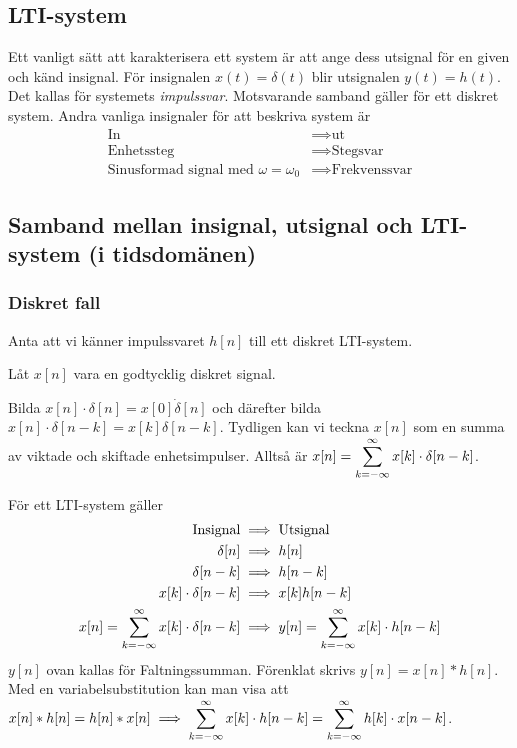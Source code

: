 \documentclass[a4paper]{article}
\begin{document}
\providecommand\fname{}
\renewcommand\fname{19-09-06}

\subsection{LTI-system}
Ett vanligt sätt att karakterisera ett system är att ange dess utsignal
för en given och känd insignal. För insignalen \(
    x(t) = \delta(t)
\) blir utsignalen \(
    y(t) = h(t)
\). Det kallas för systemets \emph{impulssvar}. Motsvarande samband gäller 
för ett diskret system. Andra vanliga insignaler för att beskriva system är
\begin{align*}
    \text{In} &\implies \text{ut} \\
    \text{Enhetssteg} &\implies \text{Stegsvar} \\
    \text{Sinusformad signal med } \omega = \omega_0 &\implies \text{Frekvenssvar} 
\end{align*}

\subsection{Samband mellan insignal, utsignal och LTI-system (i tidsdomänen)}
\subsubsection{Diskret fall}
Anta att vi känner impulssvaret \(
    h[n]
\) till ett diskret LTI-system. 

Låt \(
    x[n]
\) vara en godtycklig diskret signal. 

Bilda \(
    x[n] \cdot \delta[n] = x[0] \dot \delta[n]
\) och därefter bilda \(
    x[n]\cdot \delta[n-k] = x[k] \delta[n-k]
\). Tydligen kan vi teckna \(
    x[n]
\) som en summa av viktade och skiftade enhetsimpulser.
Alltså är \(
    x[n] = \displaystyle\sum_{k = -\infty}^{\infty} x[k] \cdot \delta[n-k]
\).

För ett LTI-system gäller 
\begin{align*}
    \text{Insignal} &\implies \text{Utsignal} \\
    \delta[n] &\implies h[n] \\
    \delta[n-k] &\implies h[n-k] \\
    x[k] \cdot \delta[n-k] &\implies x[k]h[n-k] \\
    x[n] = \displaystyle\sum_{k = -\infty}^{\infty} x[k] \cdot \delta[n-k] &\implies y[n] = \displaystyle\sum_{k = -\infty}^{\infty} x[k] \cdot h[n-k]
\end{align*}
\(
    y[n]
\) ovan kallas för Faltningssumman. Förenklat skrivs \(
    y[n] = x[n] * h[n]
\). Med en variabelsubstitution kan man visa att \(
    x[n] * h[n] = h[n] * x[n] \implies \displaystyle\sum_{k = -\infty}^{\infty} x[k] \cdot h[n-k] = \displaystyle\sum_{k = -\infty}^{\infty} h[k] \cdot x[n-k]
\).
\end{document}
